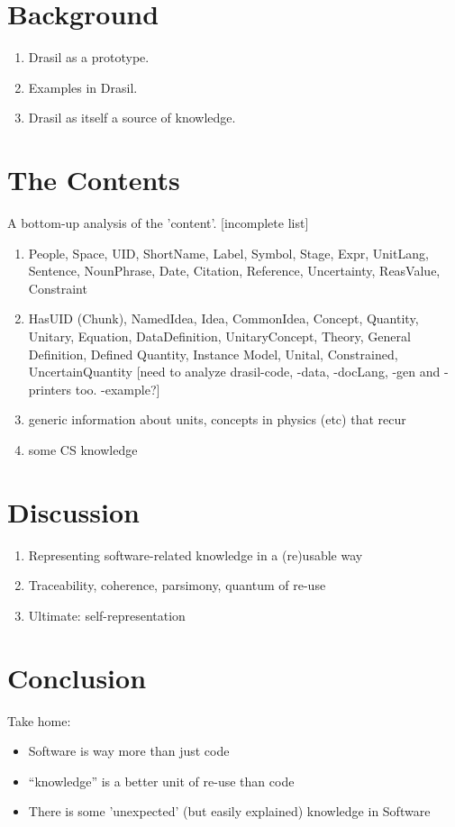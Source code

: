 \documentclass[10pt,conference]{IEEEtran}
\begin{document}
\section{Background}
\begin{enumerate}
  \item Drasil as a prototype.
  \item Examples in Drasil.
  \item Drasil as itself a source of knowledge. 
\end{enumerate}

\section{The Contents}
  A bottom-up analysis of the 'content'. [incomplete list]
  \begin{enumerate}
  \item People, Space, UID, ShortName, Label, Symbol, Stage, Expr, UnitLang, Sentence, NounPhrase, Date, Citation, Reference, Uncertainty, ReasValue, Constraint
  \item HasUID (Chunk), NamedIdea, Idea, CommonIdea, Concept, Quantity, Unitary, Equation, DataDefinition, UnitaryConcept,
    Theory, General Definition, Defined Quantity, Instance Model, Unital, Constrained, UncertainQuantity
  [need to analyze drasil-code, -data, -docLang, -gen and -printers too. -example?]
  \item generic information about units, concepts in physics (etc) that recur
  \item some CS knowledge 
  \end{enumerate}

\section{Discussion}
\begin{enumerate}
  \item Representing software-related knowledge in a (re)usable way
  \item Traceability, coherence, parsimony, quantum of re-use
  \item Ultimate: self-representation 
\end{enumerate}

\section{Conclusion}

Take home:
\begin{itemize}
\item Software is way more than just code
\item ``knowledge'' is a better unit of re-use than code
\item There is some 'unexpected' (but easily explained) knowledge in Software 
\end{itemize}



\end{document}
